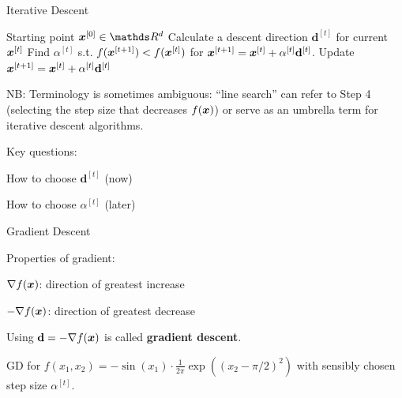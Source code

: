 \documentclass[11pt,compress,t,notes=noshow, xcolor=table]{beamer}
\begin{document}
\begin{framev}{Iterative Descent}
\begin{algorithm}[H]
\caption{Iterative Descent / Line search}
\begin{algorithmic}[1]
\State Starting point $\xv^{[0]} \in \R^d$
\State Calculate a descent direction $\mathbf{d}^{[t]}$ for current $\bm{x}^{[t]}$
\State Find $\alpha^{[t]}$ s.t. $f(\bm{x}^{[t + 1]}) < f(\bm{x}^{[t]})$ for $\bm{x}^{[t + 1]} = \bm{x}^{[t]} + \alpha^{[t]} \mathbf{d}^{[t]}$.
\State Update $\bm{x}^{[t + 1]} = \bm{x}^{[t]} + \alpha^{[t]} \mathbf{d}^{[t]}$
\EndWhile
\end{algorithmic}
\end{algorithm}
\begin{tiny}
NB: Terminology is sometimes ambiguous: ``line search'' can refer to Step 4 (selecting the step size that decreases $f(\bm{x})$) or serve as an umbrella term for iterative descent algorithms. \par
\end{tiny}\vfill
Key questions:
\begin{itemizeM}
\item How to choose $\mathbf{d}^{[t]}$ (now)
\item How to choose $\alpha^{[t]}$ (later)
\end{itemizeM}
\end{framev}


\begin{framei}{Gradient Descent}
\item Properties of gradient:
\begin{itemizeS}
\item $\nabla f(\bm{x})$: direction of greatest increase
\item $- \nabla f(\bm{x})$: direction of greatest decrease
\end{itemizeS}
\vfill
\item Using $\mathbf{d} = - \nabla f(\bm{x})$ is called \textbf{gradient descent}.
\begin{center}\begin{footnotesize}
GD for $f(x_1, x_2) = - \sin(x_1) \cdot \frac{1}{2\pi} \exp\left( (x_2 - \pi / 2)^2 \right)$ with sensibly chosen step size $\alpha^{[t]}$.
\end{footnotesize}\end{center}
\end{framei}
\end{document}
